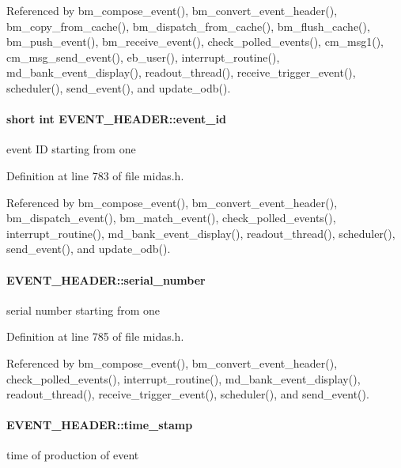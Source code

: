 Referenced by bm\_\-compose\_\-event(), bm\_\-convert\_\-event\_\-header(), bm\_\-copy\_\-from\_\-cache(), bm\_\-dispatch\_\-from\_\-cache(), bm\_\-flush\_\-cache(), bm\_\-push\_\-event(), bm\_\-receive\_\-event(), check\_\-polled\_\-events(), cm\_\-msg1(), cm\_\-msg\_\-send\_\-event(), eb\_\-user(), interrupt\_\-routine(), md\_\-bank\_\-event\_\-display(), readout\_\-thread(), receive\_\-trigger\_\-event(), scheduler(), send\_\-event(), and update\_\-odb().
\paragraph[{event\_\-id}]{\setlength{\rightskip}{0pt plus 5cm}short int {\bf EVENT\_\-HEADER::event\_\-id}}\hfill\label{structEVENT__HEADER_a107bbb0fbe21582dc0f0e78f60b997b3}
event ID starting from one 

Definition at line 783 of file midas.h.

Referenced by bm\_\-compose\_\-event(), bm\_\-convert\_\-event\_\-header(), bm\_\-dispatch\_\-event(), bm\_\-match\_\-event(), check\_\-polled\_\-events(), interrupt\_\-routine(), md\_\-bank\_\-event\_\-display(), readout\_\-thread(), scheduler(), send\_\-event(), and update\_\-odb().
\paragraph[{serial\_\-number}]{ {\bf EVENT\_\-HEADER::serial\_\-number}}\hfill\label{structEVENT__HEADER_a5ed07c075ebce619a8fa47e96f188440}
serial number starting from one 

Definition at line 785 of file midas.h.

Referenced by bm\_\-compose\_\-event(), bm\_\-convert\_\-event\_\-header(), check\_\-polled\_\-events(), interrupt\_\-routine(), md\_\-bank\_\-event\_\-display(), readout\_\-thread(), receive\_\-trigger\_\-event(), scheduler(), and send\_\-event().
\paragraph[{time\_\-stamp}]{ {\bf EVENT\_\-HEADER::time\_\-stamp}}\hfill\label{structEVENT__HEADER_a989421ee804ab76a0e11ac1c9c3b0e7a}
time of production of event 

